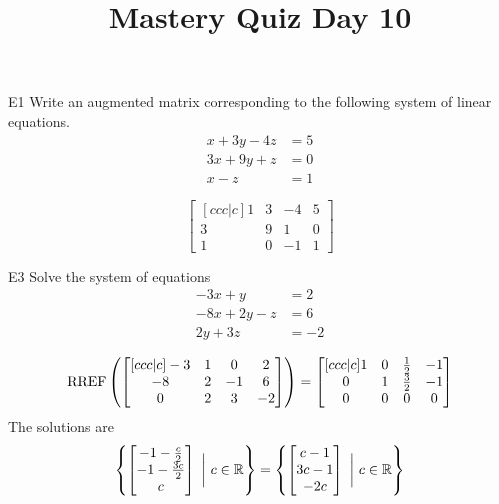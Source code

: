\documentclass{sbgLAquiz}
\title{Mastery Quiz Day 10 }
\begin{document}
\begin{problem}{E1}
Write an augmented matrix corresponding to the following system of linear equations.
\begin{align*}
x+3y-4z &= 5 \\
3x+9y+z &= 0 \\
x-z &= 1
\end{align*}
\end{problem}
\begin{solution}
\[
\begin{bmatrix}[ccc|c]
1 & 3 & -4 & 5 \\
3 & 9 & 1 & 0 \\
1 & 0 & -1 & 1
\end{bmatrix}
\]
\end{solution}

\begin{problem}{E3}
Solve the system of equations
\begin{align*}
-3x +y &= 2\\
-8x+2y-z &= 6 \\
2y+3z &= -2
\end{align*}


\end{problem}

\begin{solution}
$$\operatorname{RREF}\left(\begin{bmatrix}[ccc|c] -3 & 1 & 0 & 2 \\ -8 & 2 & -1 & 6 \\ 0 & 2 & 3 & -2 \end{bmatrix} \right) = \begin{bmatrix}[ccc|c] 1 & 0 & \frac{1}{2} & -1 \\ 0 & 1 & \frac{3}{2} & -1 \\ 0 & 0 & 0 & 0 \end{bmatrix}$$
The solutions are $$\left\{ \begin{bmatrix} -1-\frac{c}{2} \\ -1-\frac{3c}{2} \\ c \end{bmatrix}\ \bigg|\ c\in \mathbb{R}\right\} = \left\{ \begin{bmatrix} c-1 \\ 3c-1 \\ -2c  \end{bmatrix}\ \bigg|\ c\in \mathbb{R}\right\}$$
\end{solution}
\end{document}
